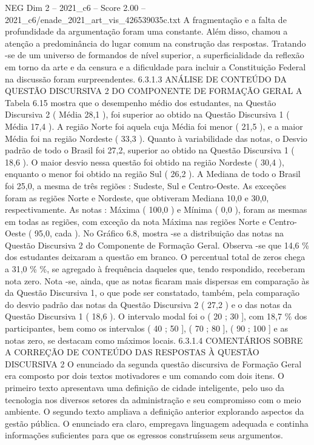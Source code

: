 \begin{textsample}{NEG Dim 2 – 2021\_c6 – Score 2.00 – 2021\_c6/enade\_2021\_art\_vis\_426539035c.txt}
A fragmentação e a falta de profundidade da argumentação foram uma constante.
Além disso, chamou a atenção a predominância do lugar comum na construção das respostas.
Tratando -se de um universo de formandos de nível superior, a superficialidade da reflexão em torno da arte e da censura e a dificuldade para incluir a Constituição Federal na discussão foram surpreendentes. 6.3.1.3 ANÁLISE DE CONTEÚDO DA QUESTÃO DISCURSIVA 2 DO COMPONENTE DE FORMAÇÃO GERAL A Tabela 6.15 mostra que o desempenho médio dos estudantes, na Questão Discursiva 2 ( Média 28,1 ), foi superior ao obtido na Questão Discursiva 1 ( Média 17,4 ).
A região Norte foi aquela cuja Média foi menor ( 21,5 ), e a maior Média foi na região Nordeste ( 33,3 ).
Quanto à variabilidade das notas, o Desvio padrão de todo o Brasil foi 27,2, superior ao obtido na Questão Discursiva 1 ( 18,6 ).
O maior desvio nessa questão foi obtido na região Nordeste ( 30,4 ), enquanto o menor foi obtido na região Sul ( 26,2 ).
A Mediana de todo o Brasil foi 25,0, a mesma de três regiões : Sudeste, Sul e Centro-Oeste.
As exceções foram as regiões Norte e Nordeste, que obtiveram Mediana 10,0 e 30,0, respectivamente.
As notas : Máxima ( 100,0 ) e Mínima ( 0,0 ), foram as mesmas em todas as regiões, com exceção da nota Máxima nas regiões Norte e Centro-Oeste ( 95,0, cada ).
No Gráfico 6.8, mostra -se a distribuição das notas na Questão Discursiva 2 do Componente de Formação Geral.
Observa -se que 14,6 \% dos estudantes deixaram a questão em branco.
O percentual total de zeros chega a 31,0 \% \%, se agregado à frequência daqueles que, tendo respondido, receberam nota zero.
Nota -se, ainda, que as notas ficaram mais dispersas em comparação às da Questão Discursiva 1, o que pode ser constatado, também, pela comparação do desvio padrão das notas da Questão Discursiva 2 ( 27,2 ) e o das notas da Questão Discursiva 1 ( 18,6 ).
O intervalo modal foi o ( 20 ; 30 ], com 18,7 \% dos participantes, bem como os intervalos ( 40 ; 50 ], ( 70 ; 80 ], ( 90 ; 100 ] e as notas zero, se destacam como máximos locais. 6.3.1.4 COMENTÁRIOS SOBRE A CORREÇÃO DE CONTEÚDO DAS RESPOSTAS À QUESTÃO DISCURSIVA 2 O enunciado da segunda questão discursiva de Formação Geral era composto por dois textos motivadores e um comando com dois itens.
O primeiro texto apresentava uma definição de cidade inteligente, pelo uso da tecnologia nos diversos setores da administração e seu compromisso com o meio ambiente.
O segundo texto ampliava a definição anterior explorando aspectos da gestão pública.
O enunciado era claro, empregava linguagem adequada e continha informações suficientes para que os egressos construíssem seus argumentos.

\end{textsample}
